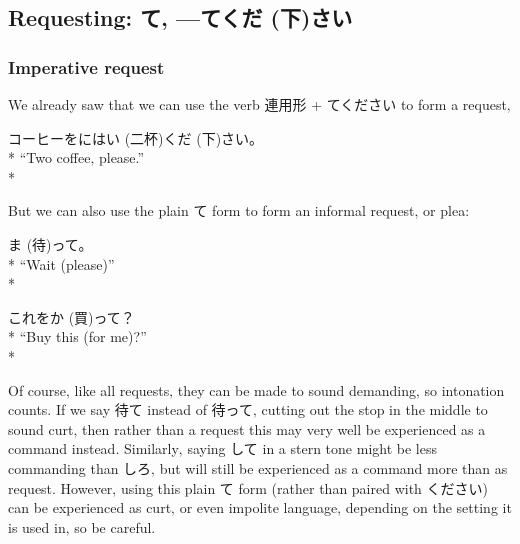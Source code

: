 \documentclass[11pt, b5paper, twoside, openright, onecolumn]{book}
\makeatletter
\newcommand*{\rubystack}[2]{{\relscale{0.5}%
  \begin{tabular}[b]{@{}c@{}}%
    {#1}\\%
   {\textscale{2}{#2}}%
  \end{tabular}}%
}
\DeclareRobustCommand*{\ruby}[2]{%
  \mbox{%
    \setlength{\parskip}{0ex}%
    \BeginAccSupp{method=pdfstringdef,ActualText={#1}}%
      \rubystack{\phantom{#2}}{#1}%
      \llap{%
        \rubystack{#2}{\phantom{#1}}%
      }%
    \EndAccSupp{}%
  }%
}
\renewcommand*{\ruby}[2]{#2 (#1)}%
\newenvironment{exampleblock}{
\setlength{\parindent}{0.6in}
\begin{minipage}[t]{\dimexpr\textwidth-\parindent}}
{\end{minipage}}
\makeatother
\begin{document}
\subsection{Requesting: て‚ \index[japanese]{—て\ruby{下}{くだ}さい}—て\ruby{下}{くだ}さい}

\subsubsection{Imperative request}

We already saw that we can use the verb 連用形 + てください to form a request‚

\vspace{0.4cm}
\begin{exampleblock}
コーヒーを\ruby{二杯}{にはい}\ruby{下}{くだ}さい。 \\* 
“Two coffee‚ please.” \\* 
\end{exampleblock}
\vspace{0.2cm}

But we can also use the plain て form to form an informal request‚ or plea:

\vspace{0.4cm}
\begin{exampleblock}
\ruby{待}{ま}って。 \\* 
“Wait (please)” \\* 
\end{exampleblock}
\vspace{0.2cm}

\begin{exampleblock}
これを\ruby{買}{か}って？ \\* 
“Buy this (for me)?” \\* 
\end{exampleblock}
\vspace{0.2cm}

Of course‚ like all requests‚ they can be made to sound demanding‚ so intonation counts. If we say 待て instead of 待って‚ cutting out the stop in the middle to sound curt‚ then rather than a request this may very well be experienced as a command instead. Similarly‚ saying して in a stern tone might be less commanding than しろ‚ but will still be experienced as a command more than as request. However‚ using this plain て form (rather than paired with ください) can be experienced as curt‚ or even impolite language‚ depending on the setting it is used in‚ so be careful.
\end{document}
